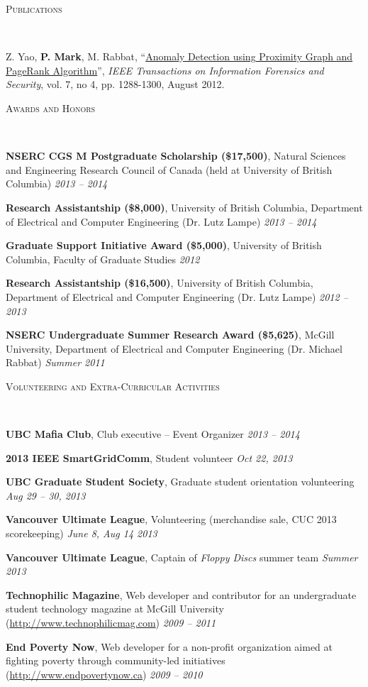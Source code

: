 \documentclass[10pt]{article}
\newenvironment{changemargin}[2]{%
  \begin{list}{}{%
    \setlength{\topsep}{0pt}%
    \setlength{\leftmargin}{#1}%
    \setlength{\rightmargin}{#2}%
    \setlength{\listparindent}{\parindent}%
    \setlength{\itemindent}{\parindent}%
    \setlength{\parsep}{\parskip}%
  }%
  \item[]}{\end{list}
}
\newcommand{\lineover}{
  \begin{changemargin}{-0.05in}{-0.05in}
    \vspace*{-8pt}
    \hrulefill \\
    \vspace*{-2pt}
  \end{changemargin}
}
\renewcommand{\section}[1]{
  \begin{changemargin}{-0.5in}{-0.5in}
    \normalsize \scshape{#1}\\
    \lineover
  \end{changemargin}
}
\newenvironment{body} {
  \vspace{2pt}
  \begin{changemargin}{-0.25in}{-0.5in}
    }{
  \end{changemargin}
}
\newcommand{\itemdescription}[3]{
  \textbf{#1}, {#2} \hfill \emph{#3}\\
  \medskip
}
\begin{document}
\section{Publications}
\begin{body}
Z. Yao, \textbf{P. Mark}, M. Rabbat, 
``\href{http://ieeexplore.ieee.org/xpl/articleDetails.jsp?arnumber=6175122}{Anomaly
Detection using Proximity Graph and PageRank Algorithm}'', \emph{IEEE 
Transactions on Information Forensics and Security}, vol. 7, no 4, pp. 
1288-1300, August 2012.
\end{body}
\bigskip

\section{Awards and Honors}
\begin{body}
\itemdescription{NSERC CGS M Postgraduate Scholarship (\$17,500)}{Natural 
Sciences and Engineering Research Council of Canada (held at University of
British Columbia)}{2013 -- 2014}
\itemdescription{Research Assistantship (\$8,000)}{University of British
Columbia, Department of Electrical and Computer Engineering (Dr. Lutz
Lampe)}{2013 -- 2014}
\itemdescription{Graduate Support Initiative Award (\$5,000)}{University of
British Columbia, Faculty of Graduate Studies}{2012}
\itemdescription{Research Assistantship (\$16,500)}{University of British 
Columbia, Department of Electrical and Computer Engineering (Dr. Lutz 
Lampe)}{2012 -- 2013}
\itemdescription{NSERC Undergraduate Summer Research Award (\$5,625)}{McGill 
University, Department of Electrical and Computer Engineering (Dr. Michael 
Rabbat)}{Summer 2011}
\end{body}
\medskip

\section{Volunteering and Extra-Curricular Activities}
\begin{body}
\itemdescription{UBC Mafia Club}{Club executive -- Event Organizer}{2013 -- 
2014}
\itemdescription{2013 IEEE SmartGridComm}{Student volunteer}{Oct 22, 2013}
\itemdescription{UBC Graduate Student Society}{Graduate student orientation
volunteering}{Aug 29 -- 30, 2013}
\itemdescription{Vancouver Ultimate League}{Volunteering (merchandise sale, CUC 
2013 scorekeeping)}{June 8, Aug 14 2013}
\itemdescription{Vancouver Ultimate League}{Captain of \emph{Floppy Discs} 
summer team}{Summer 2013}
\itemdescription{Technophilic Magazine}{Web developer and contributor for an
undergraduate student technology magazine at McGill University
(\url{http://www.technophilicmag.com})}{2009 -- 2011}
\itemdescription{End Poverty Now}{Web developer for a non-profit organization 
aimed at fighting poverty through community-led initiatives
(\url{http://www.endpovertynow.ca})}{2009 -- 2010}
\end{body}
\medskip
\end{document}
